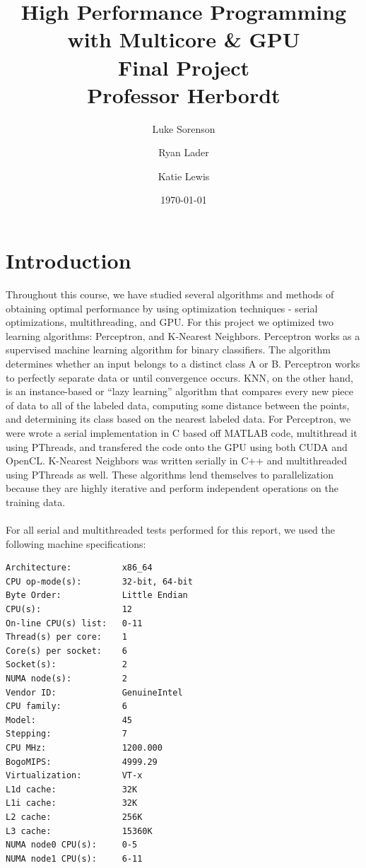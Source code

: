 \documentclass{article}
\title{High Performance Programming with Multicore \& GPU \\ Final Project \\ Professor Herbordt} %
\author{Luke Sorenson\and Ryan Lader \and Katie Lewis}
\date{\today} %
\begin{document}
\maketitle %


\section{Introduction}
Throughout this course, we have studied several algorithms and methods of obtaining optimal performance by using optimization techniques - serial optimizations, multithreading, and GPU. For this project we optimized two learning algorithms: Perceptron, and K-Nearest Neighbors. Perceptron works as a supervised machine learning algorithm for binary classifiers. The algorithm determines whether an input belongs to a distinct class A or B. Perceptron works to perfectly separate data or until convergence occurs. KNN, on the other hand, is an instance-based or ``lazy learning'' algorithm that compares every new piece of data to all of the labeled data, computing some distance between the points, and determining its class based on the nearest labeled data. For Perceptron, we were wrote a serial implementation in C based off MATLAB code, multithread it using PThreads, and transfered the code onto the GPU using both CUDA and OpenCL. K-Nearest Neighbors was written serially in C++ and multithreaded using PThreads as well. These algorithms lend themselves to parallelization because they are highly iterative and perform independent operations on the training data. \\
\\
For all serial and multithreaded tests performed for this report, we used the following machine specifications: \\
\begin{verbatim}
Architecture:          x86_64
CPU op-mode(s):        32-bit, 64-bit
Byte Order:            Little Endian
CPU(s):                12
On-line CPU(s) list:   0-11
Thread(s) per core:    1
Core(s) per socket:    6
Socket(s):             2
NUMA node(s):          2
Vendor ID:             GenuineIntel
CPU family:            6
Model:                 45
Stepping:              7
CPU MHz:               1200.000
BogoMIPS:              4999.29
Virtualization:        VT-x
L1d cache:             32K
L1i cache:             32K
L2 cache:              256K
L3 cache:              15360K
NUMA node0 CPU(s):     0-5
NUMA node1 CPU(s):     6-11
\end{verbatim}
\end{document}

